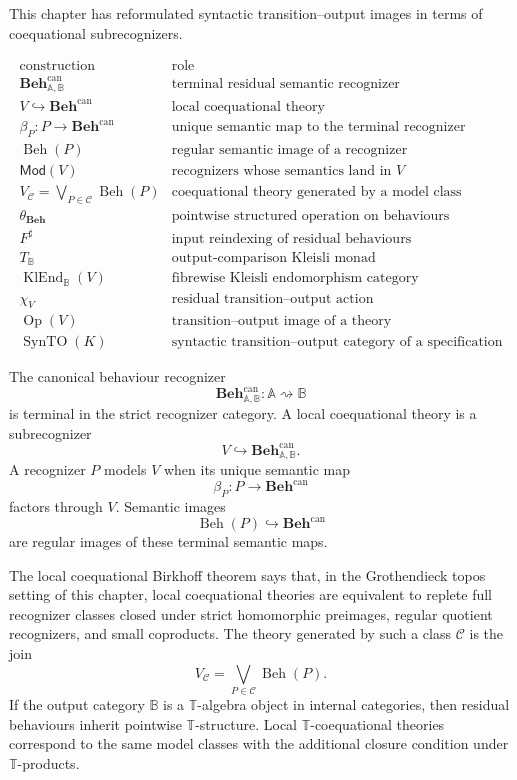 This chapter has reformulated syntactic transition--output images in terms of
coequational subrecognizers.

\[
\begin{array}{c|l}
\text{construction} & \text{role} \\
\hline
\mathbf{Beh}^{\mathrm{can}}_{\mathbb A,\mathbb B}
&
\text{terminal residual semantic recognizer}
\\
V\hookrightarrow \mathbf{Beh}^{\mathrm{can}}
&
\text{local coequational theory}
\\
\beta_P:P\to\mathbf{Beh}^{\mathrm{can}}
&
\text{unique semantic map to the terminal recognizer}
\\
\operatorname{Beh}(P)
&
\text{regular semantic image of a recognizer}
\\
\mathsf{Mod}(V)
&
\text{recognizers whose semantics land in }V
\\
V_{\mathcal C}
=
\bigvee_{P\in\mathcal C}\operatorname{Beh}(P)
&
\text{coequational theory generated by a model class}
\\
\theta_{\mathbf{Beh}}
&
\text{pointwise structured operation on behaviours}
\\
F^\sharp
&
\text{input reindexing of residual behaviours}
\\
T_{\mathbb B}
&
\text{output-comparison Kleisli monad}
\\
\operatorname{KlEnd}_{\mathbb B}(V)
&
\text{fibrewise Kleisli endomorphism category}
\\
\chi_V
&
\text{residual transition--output action}
\\
\operatorname{Op}(V)
&
\text{transition--output image of a theory}
\\
\operatorname{SynTO}(K)
&
\text{syntactic transition--output category of a specification}
\end{array}
\]

The canonical behaviour recognizer
\[
    \mathbf{Beh}^{\mathrm{can}}_{\mathbb A,\mathbb B}:
    \mathbb A\rightsquigarrow\mathbb B
\]
is terminal in the strict recognizer category. A local coequational theory is a
subrecognizer
\[
    V\hookrightarrow\mathbf{Beh}^{\mathrm{can}}_{\mathbb A,\mathbb B}.
\]
A recognizer \(P\) models \(V\) when its unique semantic map
\[
    \beta_P:P\to\mathbf{Beh}^{\mathrm{can}}
\]
factors through \(V\). Semantic images
\[
    \operatorname{Beh}(P)\hookrightarrow\mathbf{Beh}^{\mathrm{can}}
\]
are regular images of these terminal semantic maps.

The local coequational Birkhoff theorem says that, in the Grothendieck topos
setting of this chapter, local coequational theories are equivalent to replete
full recognizer classes closed under strict homomorphic preimages, regular
quotient recognizers, and small coproducts. The theory generated by such a
class \(\mathcal C\) is the join
\[
    V_{\mathcal C}
    =
    \bigvee_{P\in\mathcal C}\operatorname{Beh}(P).
\]
If the output category \(\mathbb B\) is a \(\mathbb T\)-algebra object in
internal categories, then residual behaviours inherit pointwise
\(\mathbb T\)-structure. Local \(\mathbb T\)-coequational theories correspond
to the same model classes with the additional closure condition under
\(\mathbb T\)-products.


